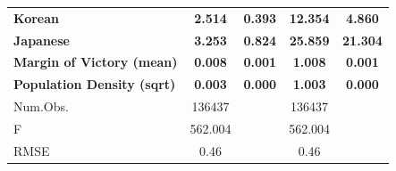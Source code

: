 \documentclass[
  letterpaper,
  DIV=11,
  numbers=noendperiod]{scrartcl}
\begin{document}
\begin{table}
{\begin{tabular}[t]{lcccc}
\textbf{Korean} & \textbf{\num{2.514}} & \textbf{\num{0.393}} & \textbf{\num{12.354}} & \textbf{\num{4.860}}\\
\textbf{Japanese} & \textbf{\num{3.253}} & \textbf{\num{0.824}} & \textbf{\num{25.859}} & \textbf{\num{21.304}}\\
\textbf{Margin of Victory (mean)} & \textbf{\num{0.008}} & \textbf{\num{0.001}} & \textbf{\num{1.008}} & \textbf{\num{0.001}}\\
\textbf{Population Density (sqrt)} & \textbf{\num{0.003}} & \textbf{\num{0.000}} & \textbf{\num{1.003}} & \textbf{\num{0.000}}\\
\midrule
Num.Obs. & \num{136437} &  & \num{136437} & \\
F & \num{562.004} &  & \num{562.004} & \\
RMSE & \num{0.46} &  & \num{0.46} & \\
\bottomrule
\end{tabular}

}

\end{table}%
\end{document}
